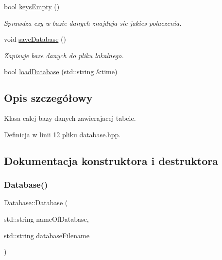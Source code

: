 \begin{DoxyCompactItemize}
\mbox{\label{class_database_a1d055600cbd151eef4a2dd7989a2ab80}} 
bool \mbox{\hyperlink{class_database_a1d055600cbd151eef4a2dd7989a2ab80}{keys\+Empty}} ()
\begin{DoxyCompactList}\small\item\em Sprawdza czy w bazie danych znajduja sie jakies polaczenia. \end{DoxyCompactList}\item 
\mbox{\label{class_database_a68c01178477790e27ae69cced3a0b437}} 
void \mbox{\hyperlink{class_database_a68c01178477790e27ae69cced3a0b437}{save\+Database}} ()
\begin{DoxyCompactList}\small\item\em Zapisuje baze danych do pliku lokalnego. \end{DoxyCompactList}\item 
bool \mbox{\hyperlink{class_database_a8ce06beb2fbd98398e0309e55a093508}{load\+Database}} (std\+::string \&time)
\end{DoxyCompactItemize}


\subsection{Opis szczegółowy}
Klasa calej bazy danych zawierajacej tabele. 

Definicja w linii 12 pliku database.\+hpp.



\subsection{Dokumentacja konstruktora i destruktora}
\mbox{\label{class_database_aab14cbf95cbe114d24a2884e9417a102}} 
\subsubsection{\texorpdfstring{Database()}{Database()}}
{\footnotesize\ttfamily Database\+::\+Database (\begin{DoxyParamCaption}\item[{std\+::string}]{name\+Of\+Database,  }\item[{std\+::string}]{database\+Filename }\end{DoxyParamCaption})}




